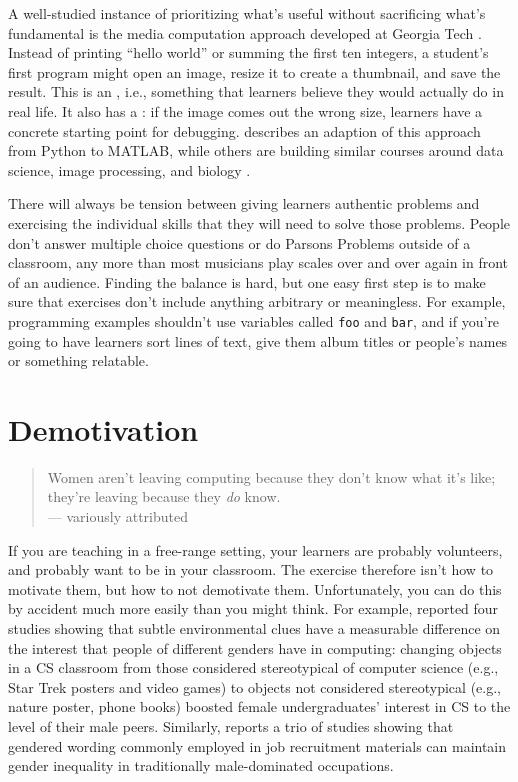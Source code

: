 A well-studied instance of prioritizing what's useful without
sacrificing what's fundamental is the media computation approach
developed at Georgia Tech \cite{Guzd2013}. Instead of printing ``hello
world'' or summing the first ten integers, a student's first program
might open an image, resize it to create a thumbnail, and save the
result. This is an , i.e.,
something that learners believe they would actually do in real life. It
also has a : if the
image comes out the wrong size, learners have a concrete starting point
for debugging. \cite{Lee2013} describes an adaption of this approach
from Python to MATLAB, while others are building similar courses around
data science, image processing, and biology
\cite{Dahl2018,Meys2018,Ritz2018}.

There will always be tension between giving learners authentic problems
and exercising the individual skills that they will need to solve those
problems. People don't answer multiple choice questions or do Parsons
Problems outside of a classroom, any more than most musicians play
scales over and over again in front of an audience. Finding the balance
is hard, but one easy first step is to make sure that exercises don't
include anything arbitrary or meaningless. For example, programming
examples shouldn't use variables called \texttt{foo} and \texttt{bar}, and if you're
going to have learners sort lines of text, give them album titles or
people's names or something relatable.

\section{Demotivation}\label{s:motivation-demotivation}

\begin{quote}

  Women aren't leaving computing because they don't know what it's like;
  they're leaving because they \emph{do} know. \\
  --- variously attributed

\end{quote}

If you are teaching in a free-range setting, your learners are probably
volunteers, and probably want to be in your classroom. The exercise
therefore isn't how to motivate them, but how to not demotivate them.
Unfortunately, you can do this by accident much more easily than you
might think. For example, \cite{Cher2009} reported four studies
showing that subtle environmental clues have a measurable difference on
the interest that people of different genders have in computing:
changing objects in a CS classroom from those considered stereotypical
of computer science (e.g., Star Trek posters and video games) to objects
not considered stereotypical (e.g., nature poster, phone books) boosted
female undergraduates' interest in CS to the level of their male peers.
Similarly, \cite{Gauc2011} reports a trio of studies showing that
gendered wording commonly employed in job recruitment materials can
maintain gender inequality in traditionally male-dominated occupations.

